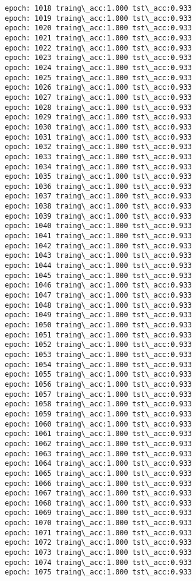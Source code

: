 \documentclass[11pt]{article}
\begin{document}
\begin{Verbatim}[commandchars=\\\{\}]
epoch: 1018 traing\_acc:1.000 tst\_acc:0.933
epoch: 1019 traing\_acc:1.000 tst\_acc:0.933
epoch: 1020 traing\_acc:1.000 tst\_acc:0.933
epoch: 1021 traing\_acc:1.000 tst\_acc:0.933
epoch: 1022 traing\_acc:1.000 tst\_acc:0.933
epoch: 1023 traing\_acc:1.000 tst\_acc:0.933
epoch: 1024 traing\_acc:1.000 tst\_acc:0.933
epoch: 1025 traing\_acc:1.000 tst\_acc:0.933
epoch: 1026 traing\_acc:1.000 tst\_acc:0.933
epoch: 1027 traing\_acc:1.000 tst\_acc:0.933
epoch: 1028 traing\_acc:1.000 tst\_acc:0.933
epoch: 1029 traing\_acc:1.000 tst\_acc:0.933
epoch: 1030 traing\_acc:1.000 tst\_acc:0.933
epoch: 1031 traing\_acc:1.000 tst\_acc:0.933
epoch: 1032 traing\_acc:1.000 tst\_acc:0.933
epoch: 1033 traing\_acc:1.000 tst\_acc:0.933
epoch: 1034 traing\_acc:1.000 tst\_acc:0.933
epoch: 1035 traing\_acc:1.000 tst\_acc:0.933
epoch: 1036 traing\_acc:1.000 tst\_acc:0.933
epoch: 1037 traing\_acc:1.000 tst\_acc:0.933
epoch: 1038 traing\_acc:1.000 tst\_acc:0.933
epoch: 1039 traing\_acc:1.000 tst\_acc:0.933
epoch: 1040 traing\_acc:1.000 tst\_acc:0.933
epoch: 1041 traing\_acc:1.000 tst\_acc:0.933
epoch: 1042 traing\_acc:1.000 tst\_acc:0.933
epoch: 1043 traing\_acc:1.000 tst\_acc:0.933
epoch: 1044 traing\_acc:1.000 tst\_acc:0.933
epoch: 1045 traing\_acc:1.000 tst\_acc:0.933
epoch: 1046 traing\_acc:1.000 tst\_acc:0.933
epoch: 1047 traing\_acc:1.000 tst\_acc:0.933
epoch: 1048 traing\_acc:1.000 tst\_acc:0.933
epoch: 1049 traing\_acc:1.000 tst\_acc:0.933
epoch: 1050 traing\_acc:1.000 tst\_acc:0.933
epoch: 1051 traing\_acc:1.000 tst\_acc:0.933
epoch: 1052 traing\_acc:1.000 tst\_acc:0.933
epoch: 1053 traing\_acc:1.000 tst\_acc:0.933
epoch: 1054 traing\_acc:1.000 tst\_acc:0.933
epoch: 1055 traing\_acc:1.000 tst\_acc:0.933
epoch: 1056 traing\_acc:1.000 tst\_acc:0.933
epoch: 1057 traing\_acc:1.000 tst\_acc:0.933
epoch: 1058 traing\_acc:1.000 tst\_acc:0.933
epoch: 1059 traing\_acc:1.000 tst\_acc:0.933
epoch: 1060 traing\_acc:1.000 tst\_acc:0.933
epoch: 1061 traing\_acc:1.000 tst\_acc:0.933
epoch: 1062 traing\_acc:1.000 tst\_acc:0.933
epoch: 1063 traing\_acc:1.000 tst\_acc:0.933
epoch: 1064 traing\_acc:1.000 tst\_acc:0.933
epoch: 1065 traing\_acc:1.000 tst\_acc:0.933
epoch: 1066 traing\_acc:1.000 tst\_acc:0.933
epoch: 1067 traing\_acc:1.000 tst\_acc:0.933
epoch: 1068 traing\_acc:1.000 tst\_acc:0.933
epoch: 1069 traing\_acc:1.000 tst\_acc:0.933
epoch: 1070 traing\_acc:1.000 tst\_acc:0.933
epoch: 1071 traing\_acc:1.000 tst\_acc:0.933
epoch: 1072 traing\_acc:1.000 tst\_acc:0.933
epoch: 1073 traing\_acc:1.000 tst\_acc:0.933
epoch: 1074 traing\_acc:1.000 tst\_acc:0.933
epoch: 1075 traing\_acc:1.000 tst\_acc:0.933

\end{Verbatim}
\end{document}
